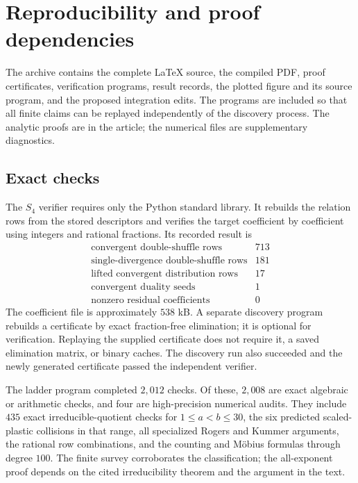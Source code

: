 \section{Reproducibility and proof dependencies}
\label{sec:verification}

The archive contains the complete \LaTeX{} source, the compiled PDF,
proof certificates, verification programs, result records, the plotted
figure and its source program, and the proposed integration edits.
The programs are included so that all finite claims can be replayed
independently of the discovery process. The analytic proofs are in
the article; the numerical files are supplementary diagnostics.

\subsection{Exact checks}

The $S_4$ verifier requires only the Python standard library. It rebuilds
the relation rows from the stored descriptors and verifies the target
coefficient by coefficient using integers and rational fractions.
Its recorded result is
\[
 \begin{array}{c|r}
 \text{convergent double-shuffle rows}&713\\
 \text{single-divergence double-shuffle rows}&181\\
 \text{lifted convergent distribution rows}&17\\
 \text{convergent duality seeds}&1\\\hline
 \text{nonzero residual coefficients}&0
 \end{array}
\]
The coefficient file is approximately $538$ kB. A separate discovery
program rebuilds a certificate by exact fraction-free elimination;
it is optional for verification. Replaying the supplied certificate
does not require it, a saved elimination matrix, or binary caches.
The discovery run also succeeded and the newly generated certificate
passed the independent verifier.

The ladder program completed $2{,}012$ checks. Of these, $2{,}008$
are exact algebraic or arithmetic checks, and four are high-precision
numerical audits. They include $435$ exact irreducible-quotient checks
for $1\le a<b\le30$, the six predicted scaled-plastic collisions in
that range, all specialized Rogers and Kummer arguments, the rational
row combinations, and the counting and M\"obius formulas through
degree $100$. The finite survey corroborates the classification;
the all-exponent proof depends on the cited irreducibility theorem
and the argument in the text.

